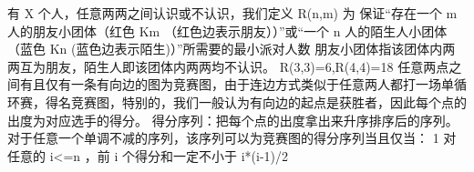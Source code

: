 {}
\markdownRendererSectionEnd 
\markdownRendererSectionEnd \markdownRendererSectionBegin
{}\markdownRendererInterblockSeparator
{}有\markdownRendererDollarSign{} X \markdownRendererDollarSign{}个人，任意两两之间认识或不认识，我们定义\markdownRendererDollarSign{} R(n,m) \markdownRendererDollarSign{}为 保证“存在一个 m 人的朋友小团体（红色 \markdownRendererDollarSign{} K\markdownRendererUnderscore{}m \markdownRendererDollarSign{}（红色边表示朋友））”或“一个 n 人的陌生人小团体（蓝色 \markdownRendererDollarSign{} K\markdownRendererUnderscore{}n \markdownRendererDollarSign{}(蓝色边表示陌生)）”所需要的最小派对人数\markdownRendererParagraphSeparator
{}朋友小团体指该团体内两两互为朋友，陌生人即该团体内两两均不认识。\markdownRendererParagraphSeparator
{}\markdownRendererDollarSign{} R(3,3)=6,R(4,4)=18 \markdownRendererDollarSign{}\markdownRendererInterblockSeparator
{}
\markdownRendererSectionEnd \markdownRendererSectionBegin
{}\markdownRendererInterblockSeparator
{}任意两点之间有且仅有一条有向边的图为竞赛图，由于连边方式类似于任意两人都打一场单循环赛，得名竞赛图，特别的，我们一般认为有向边的起点是获胜者，因此每个点的出度为对应选手的得分。\markdownRendererParagraphSeparator
{}得分序列：把每个点的出度拿出来升序排序后的序列。\markdownRendererParagraphSeparator
{}\markdownRendererSectionBegin
\markdownRendererSectionBegin
{}\markdownRendererInterblockSeparator
{}对于任意一个单调不减的序列，该序列可以为竞赛图的得分序列当且仅当：\markdownRendererParagraphSeparator
{}\markdownRendererDollarSign{} 1 \markdownRendererDollarSign{}对任意的\markdownRendererDollarSign{} i<=n \markdownRendererDollarSign{}，前\markdownRendererDollarSign{} i \markdownRendererDollarSign{}个得分和一定不小于\markdownRendererDollarSign{} i*(i-1)/2 \markdownRendererDollarSign{}\markdownRendererParagraphSeparator
